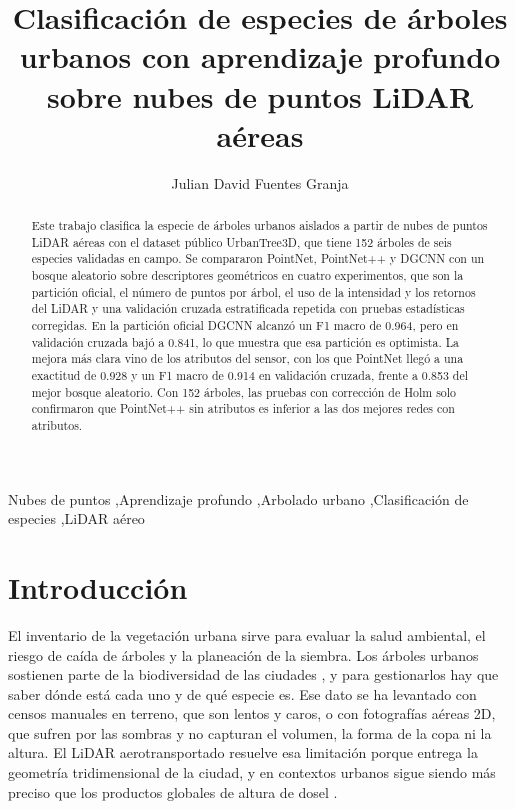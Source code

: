 \documentclass[preprint,12pt]{elsarticle}
\begin{document}
\begin{frontmatter}

\title{Clasificación de especies de árboles urbanos con aprendizaje profundo sobre nubes de puntos LiDAR aéreas}

\author{Julian David Fuentes Granja}

\begin{abstract}
Este trabajo clasifica la especie de árboles urbanos aislados a partir de nubes de puntos LiDAR aéreas con el dataset público UrbanTree3D, que tiene 152 árboles de seis especies validadas en campo. Se compararon PointNet, PointNet++ y DGCNN con un bosque aleatorio sobre descriptores geométricos en cuatro experimentos, que son la partición oficial, el número de puntos por árbol, el uso de la intensidad y los retornos del LiDAR y una validación cruzada estratificada repetida con pruebas estadísticas corregidas. En la partición oficial DGCNN alcanzó un F1 macro de 0.964, pero en validación cruzada bajó a 0.841, lo que muestra que esa partición es optimista. La mejora más clara vino de los atributos del sensor, con los que PointNet llegó a una exactitud de 0.928 y un F1 macro de 0.914 en validación cruzada, frente a 0.853 del mejor bosque aleatorio. Con 152 árboles, las pruebas con corrección de Holm solo confirmaron que PointNet++ sin atributos es inferior a las dos mejores redes con atributos.
\end{abstract}

\begin{keyword}
Nubes de puntos \sep Aprendizaje profundo \sep Arbolado urbano \sep Clasificación de especies \sep LiDAR aéreo
\end{keyword}

\end{frontmatter}

\section{Introducción}
\label{sec:intro}

El inventario de la vegetación urbana sirve para evaluar la salud ambiental, el riesgo de caída de árboles y la planeación de la siembra. Los árboles urbanos sostienen parte de la biodiversidad de las ciudades \cite{jovanovic2025urbantrees}, y para gestionarlos hay que saber dónde está cada uno y de qué especie es. Ese dato se ha levantado con censos manuales en terreno, que son lentos y caros, o con fotografías aéreas 2D, que sufren por las sombras y no capturan el volumen, la forma de la copa ni la altura. El LiDAR aerotransportado resuelve esa limitación porque entrega la geometría tridimensional de la ciudad, y en contextos urbanos sigue siendo más preciso que los productos globales de altura de dosel \cite{dong2025highprecision}.
\end{document}

